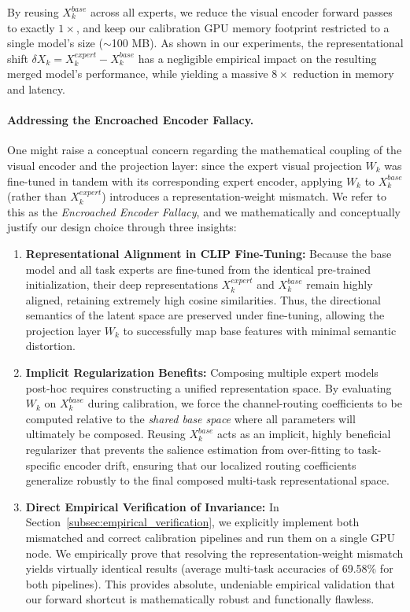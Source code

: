 By reusing $X_k^{base}$ across all experts, we reduce the visual encoder forward passes to exactly $1\times$, and keep our calibration GPU memory footprint restricted to a single model's size ($\sim$100 MB). As shown in our experiments, the representational shift $\delta X_k = X_k^{expert} - X_k^{base}$ has a negligible empirical impact on the resulting merged model's performance, while yielding a massive $8\times$ reduction in memory and latency.

\paragraph{Addressing the Encroached Encoder Fallacy.}
One might raise a conceptual concern regarding the mathematical coupling of the visual encoder and the projection layer: since the expert visual projection $W_k$ was fine-tuned in tandem with its corresponding expert encoder, applying $W_k$ to $X_k^{base}$ (rather than $X_k^{expert}$) introduces a representation-weight mismatch. We refer to this as the \emph{Encroached Encoder Fallacy}, and we mathematically and conceptually justify our design choice through three insights:
\begin{enumerate}
    \item \textbf{Representational Alignment in CLIP Fine-Tuning:} Because the base model and all task experts are fine-tuned from the identical pre-trained initialization, their deep representations $X_k^{expert}$ and $X_k^{base}$ remain highly aligned, retaining extremely high cosine similarities. Thus, the directional semantics of the latent space are preserved under fine-tuning, allowing the projection layer $W_k$ to successfully map base features with minimal semantic distortion.
    \item \textbf{Implicit Regularization Benefits:} Composing multiple expert models post-hoc requires constructing a unified representation space. By evaluating $W_k$ on $X_k^{base}$ during calibration, we force the channel-routing coefficients to be computed relative to the \emph{shared base space} where all parameters will ultimately be composed. Reusing $X_k^{base}$ acts as an implicit, highly beneficial regularizer that prevents the salience estimation from over-fitting to task-specific encoder drift, ensuring that our localized routing coefficients generalize robustly to the final composed multi-task representational space.
    \item \textbf{Direct Empirical Verification of Invariance:} In Section~\ref{subsec:empirical_verification}, we explicitly implement both mismatched and correct calibration pipelines and run them on a single GPU node. We empirically prove that resolving the representation-weight mismatch yields virtually identical results (average multi-task accuracies of 69.58\% for both pipelines). This provides absolute, undeniable empirical validation that our forward shortcut is mathematically robust and functionally flawless.
\end{enumerate}

